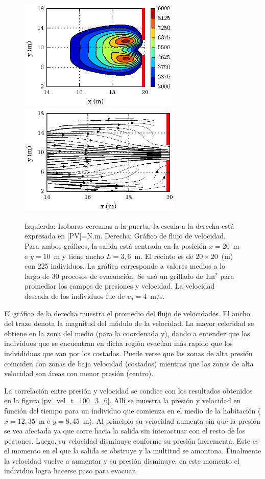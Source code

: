 \begin{figure}[H]
    \centering
    \includegraphics[height=5.3cm]{figuras/press_225p_v4_onedoor_3_6.eps}
        \includegraphics[height=5.3cm]{figuras/flujo_door_3_6m.eps}
    \caption[width=5cm]{Izquierda: Isobaras cercanas a la puerta; la escala a la derecha está expresada en [PV]=N.m. Derecha: Gráfico de flujo de velocidad. Para ambos gráficos, la salida está centrada en la posición $x=20$~m e $y=10$~m y tiene ancho $L=3,6$~m. El recinto es de $20\times 20$~(m) con 225 individuos. La gráfica corresponde a valores medios a lo largo de 30 procesos de evacuación. Se usó un grillado de 1m$^2$ para promediar los campos de presiones y velocidad. La velocidad deseada de los individuos fue de $v_d=4$~m/s.}
    \label{isobaras_flujo_3_6m}
\end{figure}

El gráfico de la derecha muestra el promedio del flujo de velocidades. El ancho del trazo denota la magnitud del módulo de la velocidad. La mayor celeridad se obtiene en la zona del medio (para la coordenada y), dando a entender que los individuos que se encuentran en dicha región evacúan más rapido que los indvididuos que van por los costados. 
Puede verse que las zonas de alta presión coinciden con zonas de baja velocidad (costados) mientras que las zonas de alta velocidad son áreas con menor presión (centro). 

La correlación entre presión y velocidad se condice con los resultados obtenidos en la figura \ref{pv_vel_t_100_3_6}. Allí se muestra la presión y velocidad en función del tiempo para un individuo que comienza en el medio de la habitación ($x=12,35$~m e $y=8,45$~m). Al principio su velocidad aumenta sin que la presión se vea afectada ya que corre hacia la salida sin interactuar con el resto de los peatones. Luego, su velocidad disminuye conforme su presión incrementa. Este es el momento en el que la salida se obstruye y la multitud se amontona. Finalmente la velocidad vuelve a aumentar y su presión disminuye, en este momento el individuo logra hacerse paso para evacuar. 

